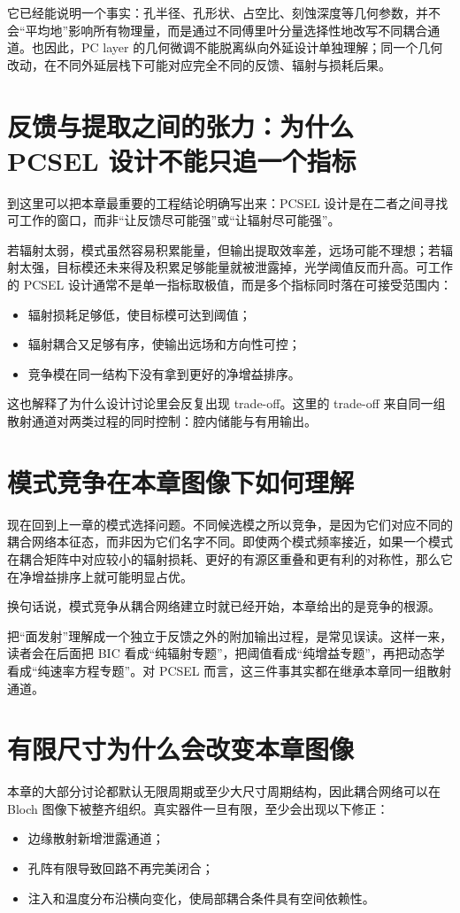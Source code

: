 它已经能说明一个事实：孔半径、孔形状、占空比、刻蚀深度等几何参数，并不会“平均地”影响所有物理量，而是通过不同傅里叶分量选择性地改写不同耦合通道。也因此，PC layer 的几何微调不能脱离纵向外延设计单独理解；同一个几何改动，在不同外延层栈下可能对应完全不同的反馈、辐射与损耗后果。

\section{反馈与提取之间的张力：为什么 PCSEL 设计不能只追一个指标}
到这里可以把本章最重要的工程结论明确写出来：PCSEL 设计是在二者之间寻找可工作的窗口，而非“让反馈尽可能强”或“让辐射尽可能强”。

若辐射太弱，模式虽然容易积累能量，但输出提取效率差，远场可能不理想；若辐射太强，目标模还未来得及积累足够能量就被泄露掉，光学阈值反而升高。可工作的 PCSEL 设计通常不是单一指标取极值，而是多个指标同时落在可接受范围内：
\begin{itemize}
  \item 辐射损耗足够低，使目标模可达到阈值；
  \item 辐射耦合又足够有序，使输出远场和方向性可控；
  \item 竞争模在同一结构下没有拿到更好的净增益排序。
\end{itemize}

这也解释了为什么设计讨论里会反复出现 trade-off。这里的 trade-off 来自同一组散射通道对两类过程的同时控制：腔内储能与有用输出。

\section{模式竞争在本章图像下如何理解}
现在回到上一章的模式选择问题。不同候选模之所以竞争，是因为它们对应不同的耦合网络本征态，而非因为它们名字不同。即使两个模式频率接近，如果一个模式在耦合矩阵中对应较小的辐射损耗、更好的有源区重叠和更有利的对称性，那么它在净增益排序上就可能明显占优。

换句话说，模式竞争从耦合网络建立时就已经开始，本章给出的是竞争的根源。

\begin{PitfallBox}
把“面发射”理解成一个独立于反馈之外的附加输出过程，是常见误读。这样一来，读者会在后面把 BIC 看成“纯辐射专题”，把阈值看成“纯增益专题”，再把动态学看成“纯速率方程专题”。对 PCSEL 而言，这三件事其实都在继承本章同一组散射通道。
\end{PitfallBox}

\section{有限尺寸为什么会改变本章图像}
本章的大部分讨论都默认无限周期或至少大尺寸周期结构，因此耦合网络可以在 Bloch 图像下被整齐组织。真实器件一旦有限，至少会出现以下修正：
\begin{itemize}
  \item 边缘散射新增泄露通道；
  \item 孔阵有限导致回路不再完美闭合；
  \item 注入和温度分布沿横向变化，使局部耦合条件具有空间依赖性。
\end{itemize}

